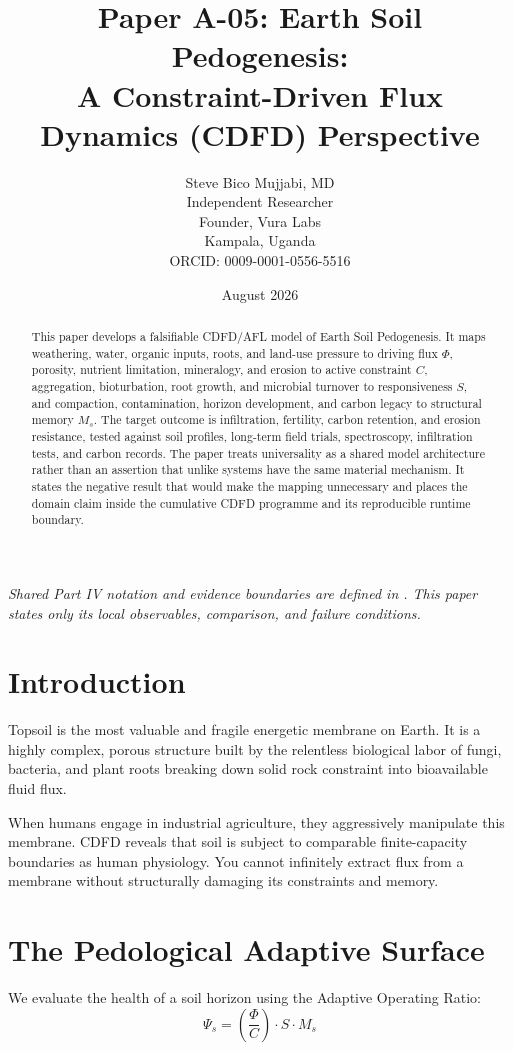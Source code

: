 \documentclass[11pt,a4paper]{article}
\title{\textbf{Paper A-05: Earth Soil Pedogenesis:\\ A Constraint-Driven Flux Dynamics (CDFD) Perspective}}
\author{Steve Bico Mujjabi, MD\\
\small Independent Researcher\\
\small Founder, Vura Labs\\
\small Kampala, Uganda\\
\small ORCID: 0009-0001-0556-5516}
\date{August 2026}
\begin{document}
\maketitle

\noindent\textit{Shared Part IV notation and evidence boundaries are defined in . This paper states only its local observables, comparison, and failure conditions.}


\begin{abstract}
This paper develops a falsifiable CDFD/AFL model of Earth Soil Pedogenesis. It maps weathering, water, organic inputs, roots, and land-use pressure to driving flux $\Phi$, porosity, nutrient limitation, mineralogy, and erosion to active constraint $C$, aggregation, bioturbation, root growth, and microbial turnover to responsiveness $S$, and compaction, contamination, horizon development, and carbon legacy to structural memory $M_s$. The target outcome is infiltration, fertility, carbon retention, and erosion resistance, tested against soil profiles, long-term field trials, spectroscopy, infiltration tests, and carbon records. The paper treats universality as a shared model architecture rather than an assertion that unlike systems have the same material mechanism. It states the negative result that would make the mapping unnecessary and places the domain claim inside the cumulative CDFD programme and its reproducible runtime boundary.
\end{abstract}

\section{Introduction}

Topsoil is the most valuable and fragile energetic membrane on Earth. It is a highly complex, porous structure built by the relentless biological labor of fungi, bacteria, and plant roots breaking down solid rock constraint into bioavailable fluid flux.

When humans engage in industrial agriculture, they aggressively manipulate this membrane. CDFD reveals that soil is subject to comparable finite-capacity boundaries as human physiology. You cannot infinitely extract flux from a membrane without structurally damaging its constraints and memory.

\section{The Pedological Adaptive Surface}
We evaluate the health of a soil horizon using the Adaptive Operating Ratio:
\begin{equation}
    \Psi_s = \left( \frac{\Phi}{C} \right) \cdot S \cdot M_s
\end{equation}
\end{document}
